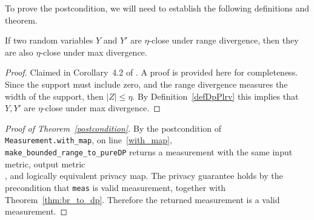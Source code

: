\documentclass{article}
\begin{document}
\begin{theorem}[Postcondition]
    \label{postcondition}
\end{theorem}

To prove the postcondition, we will need to establish the following definitions and theorem.

{}
{}

\begin{theorem}
    \label{thm:br_to_dp}
    If two random variables $Y$ and $Y'$ are $\eta$-close under range divergence,
    then they are also $\eta$-close under max divergence.
\end{theorem}

\begin{proof}
    Claimed in Corollary~4.2 of \cite{durfee2019practical}.
    A proof is provided here for completeness.
    Since the support must include zero, and the range divergence measures the width of the support,
    then $|Z| \le \eta$.
    By Definition~\ref{defDpPlrv} this implies that $Y, Y'$ are $\eta$-close under max divergence.
\end{proof}

\begin{proof}[Proof of Theorem~\ref{postcondition}]
    By the postcondition of \texttt{Measurement.with\_map}, on line~\ref{with_map}, 
    \\\texttt{make\_bounded\_range\_to\_pureDP} returns a measurement with the same input metric, 
    output metric \\, 
    and logically equivalent privacy map.
    The privacy guarantee holds by the precondition that \texttt{meas} is valid measurement,
    together with Theorem~\ref{thm:br_to_dp}.
    Therefore the returned measurement is a valid measurement.
\end{proof}



\end{document}
